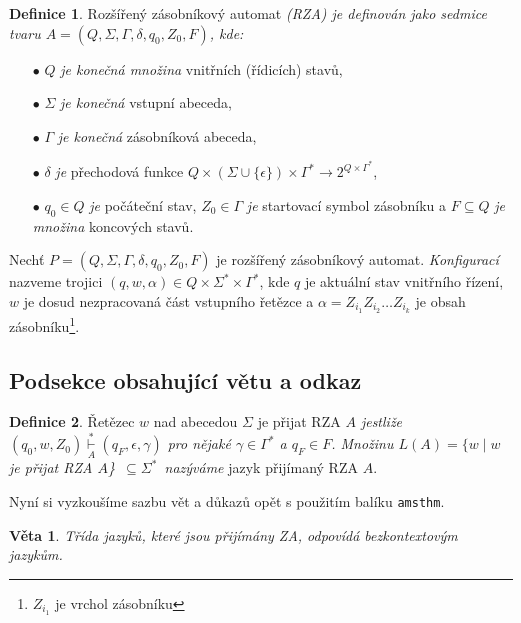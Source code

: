 \documentclass[11pt]{article}
\theoremstyle{definition}
\newtheorem{definition}{Definice}[]
\newtheorem{sentence}{Věta}[]
\begin{document}
    \begin{definition} \label{def1}
        Rozšířený zásobníkový automat \emph{(RZA) je definován jako sedmice tvaru $A = (Q, \Sigma, \Gamma, \delta, q_{0}, Z_{0}, F)$, kde:}
        \begin{itemize}
            \setlength{\itemindent}{-0.5em}
            \item[$\bullet$] $Q$ \emph{je konečná množina} vnitřních (řídicích) stavů,
            \item[$\bullet$] $\Sigma$ \emph{je konečná} vstupní abeceda,
            \item[$\bullet$] $\Gamma$ \emph{je konečná} zásobníková     abeceda,
            \item[$\bullet$] $\delta$ \emph{je} přechodová funkce $Q \times (\Sigma \cup \{\epsilon\}) \times \Gamma^{*} \rightarrow 2^{Q \times \Gamma^{*}}$,
            \item[$\bullet$] $q_{0} \in Q$ \emph{je} počáteční stav, $Z_{0} \in \Gamma$ \emph{je} startovací symbol zásobníku a $F \subseteq Q$ \emph{je množina} koncových stavů.
        \end{itemize}
    
        Nechť $P = (Q, \Sigma, \Gamma, \delta, q_{0}, Z_{0}, F)$ je rozšířený zásobníkový automat. \emph{Konfigurací} nazveme trojici $(q, w, \alpha) \in Q \times \Sigma^{*} \times \Gamma^{*}$, kde $q$ je aktuální stav vnitřního řízení, $w$ je dosud nezpracovaná část vstupního řetězce a $\alpha = Z_{i_{1}} Z_{i_{2}} \ldots Z_{i_{k}}$ je obsah zásobníku\footnote{$Z_{i_{1}}$ je vrchol zásobníku}.
    \end{definition}

    \subsection{Podsekce obsahující větu a odkaz}
    
    \begin{definition} \label{def2}
        Řetězec $w$ nad abecedou $\Sigma$ je přijat RZA \emph{$A$ jestliže $(q_{0}, w, Z_{0}) \overset{*}{\underset{A} \vdash} (q_{F}, \epsilon, \gamma)$ pro nějaké $\gamma \in \Gamma^{*}$ a $q_{F} \in F$. Množinu $L(A) = \{w \mid w$ je přijat RZA $A$\}~$\subseteq \Sigma^{*}$~nazýváme} jazyk přijímaný RZA $A$.
    \end{definition}
    
    Nyní si vyzkoušíme sazbu vět a důkazů opět s použitím balíku \texttt{amsthm}.
    
    \begin{sentence}
        \textit{Třída jazyků, které jsou přijímány ZA, odpovídá \emph{bezkontextovým jazykům}.}
    \end{sentence}
    
\end{document}

